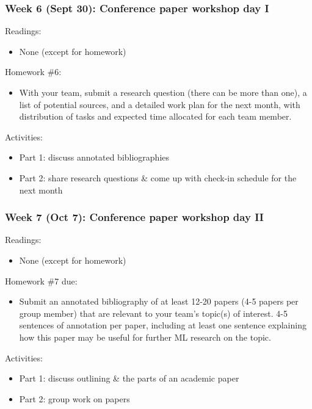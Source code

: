 \documentclass[12pt]{article}
\begin{document}
\subsubsection*{Week 6 (Sept 30): Conference paper workshop day I}
\label{sec:orga118a24}
Readings:
\begin{itemize}
\item None (except for homework)
\end{itemize}

Homework \#6:
\begin{itemize}
\item With your team, submit a research question (there can be more than
one), a list of potential sources, and a detailed work plan for the
next month, with distribution of tasks and expected time allocated
for each team member.
\end{itemize}

Activities:
\begin{itemize}
\item Part 1: discuss annotated bibliographies
\item Part 2: share research questions \& come up with check-in schedule
for the next month
\end{itemize}

\subsubsection*{Week 7 (Oct 7): Conference paper workshop day II}
\label{sec:org0c251aa}
Readings:
\begin{itemize}
\item None (except for homework)
\end{itemize}

Homework \#7 due:
\begin{itemize}
\item Submit an annotated bibliography of at least 12-20 papers (4-5
papers per group member) that are relevant to your team's topic(s)
of interest. 4-5 sentences of annotation per paper, including at
least one sentence explaining how this paper may be useful for
further ML research on the topic.
\end{itemize}

Activities:
\begin{itemize}
\item Part 1: discuss outlining \& the parts of an academic paper
\item Part 2: group work on papers
\end{itemize}
\end{document}
